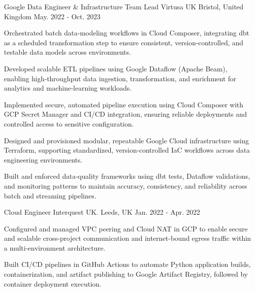 \begin{cventries}
  \cventry
    {Google  Data Engineer \& Infrastructure Team Lead} %
    {Virtusa UK} %
    {Bristol, United Kingdom} %
    {May. 2022 - Oct. 2023} %
    {
      \begin{cvitems} %
        \item {Orchestrated batch data‑modeling workflows in Cloud Composer, integrating dbt as a scheduled transformation step to ensure consistent, version‑controlled, and testable data models across environments.}
        \item {Developed scalable ETL pipelines using Google Dataflow (Apache Beam), enabling high‑throughput data ingestion, transformation, and enrichment for analytics and machine‑learning workloads.}
        \item {Implemented secure, automated pipeline execution using Cloud Composer with GCP Secret Manager and CI/CD integration, ensuring reliable deployments and controlled access to sensitive configuration.}
        \item {Designed and provisioned modular, repeatable Google Cloud infrastructure using Terraform, supporting standardized, version‑controlled IaC workflows across data engineering environments.}
        \item {Built and enforced data‑quality frameworks using dbt tests, Dataflow validations, and monitoring patterns to maintain accuracy, consistency, and reliability across batch and streaming pipelines.}
      \end{cvitems}
    }

  \cventry
    {Cloud Engineer} %
    {Interquest UK.} %
    {Leeds, UK} %
    {Jan. 2022 - Apr. 2022} %
    {
      \begin{cvitems} %
        \item {Configured and managed VPC peering and Cloud NAT in GCP to enable secure and scalable cross-project communication and internet-bound egress traffic within a multi-environment architecture.}
        \item {Built CI/CD pipelines in GitHub Actions to automate Python application builds, containerization, and artifact publishing to Google Artifact Registry, followed by container deployment execution.}
      \end{cvitems}
    }


\end{cventries}
